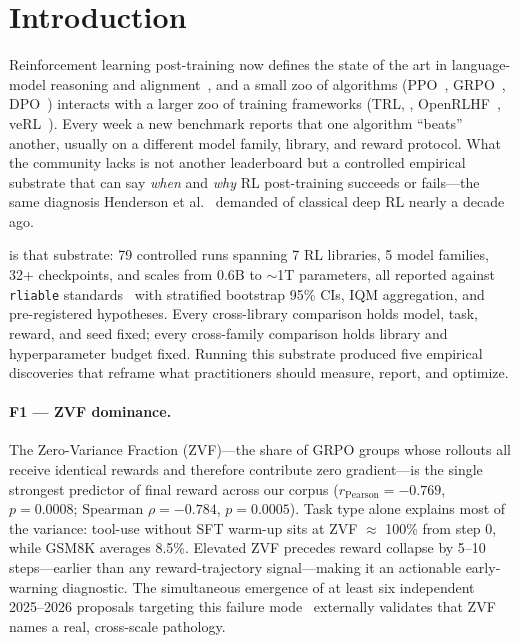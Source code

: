 \section{Introduction}
\label{sec:intro}

Reinforcement learning post-training now defines the state of the art in
language-model reasoning and alignment~\citep{ouyang2022training,%
guo2025deepseekr1nature}, and a small zoo of algorithms
(PPO~\citep{schulman2017proximal}, GRPO~\citep{shao2024deepseekmath},
DPO~\citep{rafailov2024direct}) interacts with a larger zoo of training
frameworks (TRL, \tinker{}, OpenRLHF~\citep{hu2024openrlhf},
veRL~\citep{sheng2024verl}).  Every week a new benchmark reports that one
algorithm ``beats'' another, usually on a different model family, library, and
reward protocol.  What the community lacks is not another leaderboard but a
controlled empirical substrate that can say \emph{when} and \emph{why} RL
post-training succeeds or fails---the same diagnosis Henderson et
al.~\citep{henderson2018deep} demanded of classical deep RL nearly a decade
ago.

\ours{} is that substrate: 79 controlled runs spanning 7 RL libraries,
5 model families, 32+ checkpoints, and scales from 0.6B to $\sim$1T
parameters, all reported against \texttt{rliable}
standards~\citep{agarwal2021deep} with stratified bootstrap 95\% CIs,
IQM aggregation, and pre-registered hypotheses.  Every cross-library
comparison holds model, task, reward, and seed fixed; every cross-family
comparison holds library and hyperparameter budget fixed.  Running this
substrate produced five empirical discoveries that reframe what practitioners
should measure, report, and optimize.

\paragraph{F1 --- ZVF dominance.}
The Zero-Variance Fraction (ZVF)---the share of GRPO groups whose rollouts all
receive identical rewards and therefore contribute zero gradient---is the
single strongest predictor of final reward across our corpus
($r_{\text{Pearson}}{=}{-}0.769$, $p{=}0.0008$; Spearman
$\rho{=}{-}0.784$, $p{=}0.0005$).  Task type alone explains most of the
variance: tool-use without SFT warm-up sits at ZVF $\approx$ 100\% from step 0,
while GSM8K averages 8.5\%.  Elevated ZVF precedes reward collapse by 5--10
steps---earlier than any reward-trajectory signal---making it an actionable
early-warning diagnostic.  The simultaneous emergence of at least six
independent 2025--2026 proposals targeting this failure
mode~\citep{zhang2026aero,zhang2026greso} externally validates that ZVF
names a real, cross-scale pathology.

